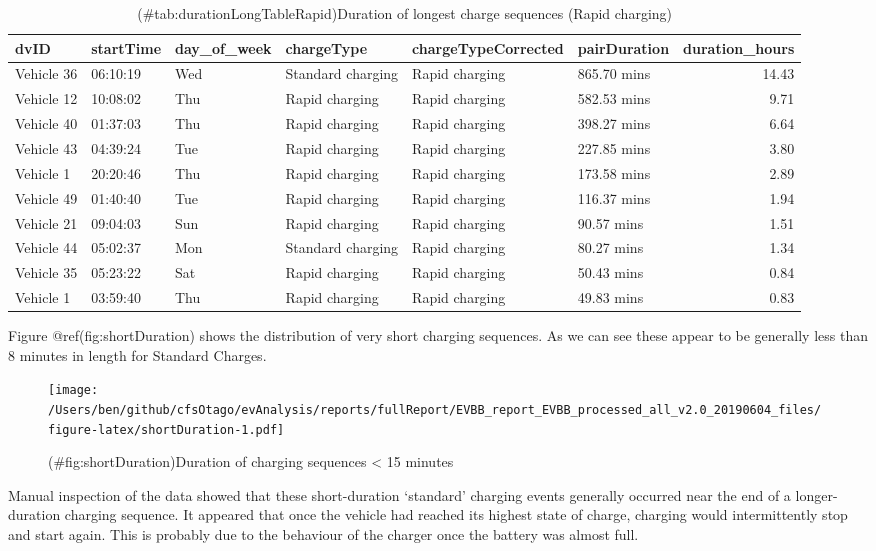 \documentclass[]{article}
\begin{document}
\begin{table}[t]

\caption{(\#tab:durationLongTableRapid)Duration of longest charge sequences (Rapid charging)}
\centering
\begin{tabular}{l|l|l|l|l|l|r}
\hline
dvID & startTime & day\_of\_week & chargeType & chargeTypeCorrected & pairDuration & duration\_hours\\
\hline
Vehicle 36 & 06:10:19 & Wed & Standard charging & Rapid charging & 865.70 mins & 14.43\\
\hline
Vehicle 12 & 10:08:02 & Thu & Rapid charging & Rapid charging & 582.53 mins & 9.71\\
\hline
Vehicle 40 & 01:37:03 & Thu & Rapid charging & Rapid charging & 398.27 mins & 6.64\\
\hline
Vehicle 43 & 04:39:24 & Tue & Rapid charging & Rapid charging & 227.85 mins & 3.80\\
\hline
Vehicle 1 & 20:20:46 & Thu & Rapid charging & Rapid charging & 173.58 mins & 2.89\\
\hline
Vehicle 49 & 01:40:40 & Tue & Rapid charging & Rapid charging & 116.37 mins & 1.94\\
\hline
Vehicle 21 & 09:04:03 & Sun & Rapid charging & Rapid charging & 90.57 mins & 1.51\\
\hline
Vehicle 44 & 05:02:37 & Mon & Standard charging & Rapid charging & 80.27 mins & 1.34\\
\hline
Vehicle 35 & 05:23:22 & Sat & Rapid charging & Rapid charging & 50.43 mins & 0.84\\
\hline
Vehicle 1 & 03:59:40 & Thu & Rapid charging & Rapid charging & 49.83 mins & 0.83\\
\hline
\end{tabular}
\end{table}

Figure @ref(fig:shortDuration) shows the distribution of very short charging sequences. As we can see these appear to be generally less than 8 minutes in length for Standard Charges.

\begin{figure}
\centering
\texttt{[image: /Users/ben/github/cfsOtago/evAnalysis/reports/fullReport/EVBB\_report\_EVBB\_processed\_all\_v2.0\_20190604\_files/figure-latex/shortDuration-1.pdf]}
\caption{(\#fig:shortDuration)Duration of charging sequences \textless{} 15 minutes}
\end{figure}

Manual inspection of the data showed that these short-duration `standard' charging events generally occurred near the end of a longer-duration charging sequence. It appeared that once the vehicle had reached its highest state of charge, charging would intermittently stop and start again. This is probably due to the behaviour of the charger once the battery was almost full.
\end{document}
